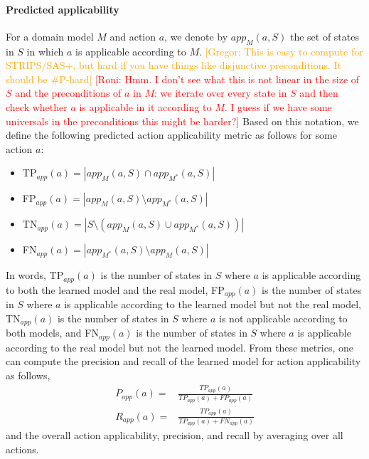 \documentclass{article}
\theoremstyle{definition}
\theoremstyle{remark}
\newcommand{\realm}{\ensuremath{M^*}\xspace}
\newcommand{\app}{\ensuremath{\textit{app}}\xspace}
\newcommand{\roni}[1]{{\textcolor{red}{[Roni: #1]}}}
\newcommand{\gregor}[1]{{\textcolor{orange}{[Gregor: #1]}}}
\begin{document}
\paragraph{Predicted applicability}
For a domain model $M$ and action $a$, we denote by $\app_M(a,S)$ the set of states in $S$ in which $a$ is applicable according to $M$. \gregor{This is easy to compute for STRIPS/SAS+, but hard if you have things like disjunctive preconditions. It should be \#P-hard}
\roni{Hmm. I don't see what this is not linear in the size of $S$ and the preconditions of $a$ in $M$: we iterate over every state in $S$ and then check whether $a$ is applicable in it according to $M$. I guess if we have some universals in the preconditions this might be harder?}
Based on this notation, we define the following predicted action applicability metric as follows for some action $a$:
\begin{itemize}
    \item TP$_{\app}(a)=|\app_M(a,S)\cap \app_\realm(a,S)|$
    \item FP$_{\app}(a)=|\app_M(a,S)\setminus \app_\realm(a,S)|$ 
    \item TN$_{\app}(a)=|S\setminus (\app_M(a,S)\cup \app_\realm(a,S))|$
    \item FN$_{\app}(a)=|\app_\realm(a,S)\setminus \app_M(a,S)|$
\end{itemize}
In words, TP$_{\app}(a)$ is the number of states in $S$ where $a$ is applicable according to both the learned model and the real model, FP$_{\app}(a)$ is the number of states in $S$ where $a$ is applicable according to the learned model but not the real model, TN$_{\app}(a)$ is the number of states in $S$ where $a$ is not applicable according to both models, and FN$_{\app}(a)$ is the number of states in $S$ where $a$ is applicable according to the real model but not the learned model. 
From these metrics, one can compute the precision and recall of the learned model for action applicability as follows,
\begin{align}
    P_{\app}(a)= & \frac{TP_{\app}(a)}{TP_{\app}(a)+FP_{\app}(a)}\\
    R_{\app}(a)= & \frac{TP_{\app}(a)}{TP_{\app}(a)+FN_{\app}(a)}    
\end{align} 
and the overall action applicability, precision, and recall
by averaging over all actions.  
\end{document}
